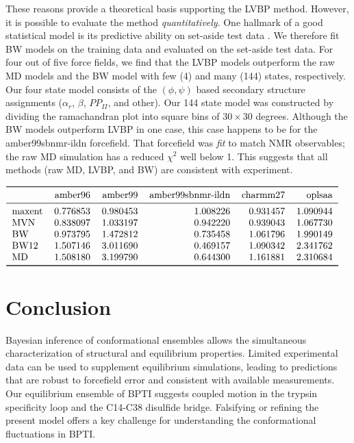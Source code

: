\documentclass[journal=jacsat,manuscript=article]{achemso}
\begin{document}
These reasons provide a theoretical basis supporting the LVBP method.  However, it is possible to evaluate the method \emph{quantitatively}.  One hallmark of a good statistical model is its predictive ability on set-aside test data \cite{friedman2001elements}.  We therefore fit BW models on the training data and evaluated on the set-aside test data.  For four out of five force fields, we find that the LVBP models outperform the raw MD models and the BW model with few (4) and many (144) states, respectively.  Our four state model consists of the $(\phi, \psi)$ based secondary structure assignments \cite{Jha2005} ($\alpha_r$, $\beta$, $PP_{II}$, and other).  Our 144 state model was constructed by dividing the ramachandran plot into square bins of $30\times30$ degrees.  Although the BW models outperform LVBP in one case, this case happens to be for the amber99sbnmr-ildn forcefield.  That forcefield was \emph{fit} to match NMR observables; the raw MD simulation has a reduced $\chi^2$ well below 1.  This suggests that all 
methods (raw MD, LVBP, and BW) are consistent with experiment.  

\begin{math}
\begin{tabular}{lrrrrr}
\toprule
{} &   amber96 &   amber99 &  amber99sbnmr-ildn &  charmm27 &    oplsaa \\
\midrule
maxent &  0.776853 &  0.980453 &           1.008226 &  0.931457 &  1.090944 \\
MVN    &  0.838097 &  1.033197 &           0.942220 &  0.939043 &  1.067730 \\
BW     &  0.973795 &  1.472812 &           0.735458 &  1.061796 &  1.990149 \\
BW12   &  1.507146 &  3.011690 &           0.469157 &  1.090342 &  2.341762 \\
MD     &  1.508180 &  3.199790 &           0.644300 &  1.161881 &  2.310684 \\
\bottomrule
\end{tabular}
\end{math}


\section{Conclusion}

Bayesian inference of conformational ensembles allows the simultaneous characterization of structural and equilibrium properties.  Limited experimental data can be used to supplement equilibrium simulations, leading to predictions that are robust to forcefield error and consistent with available measurements.  Our equilibrium ensemble of BPTI suggests coupled motion in the trypsin specificity loop and the C14-C38 disulfide bridge.  Falsifying or refining the present model offers a key challenge for understanding the conformational fluctuations in BPTI.
\end{document}
